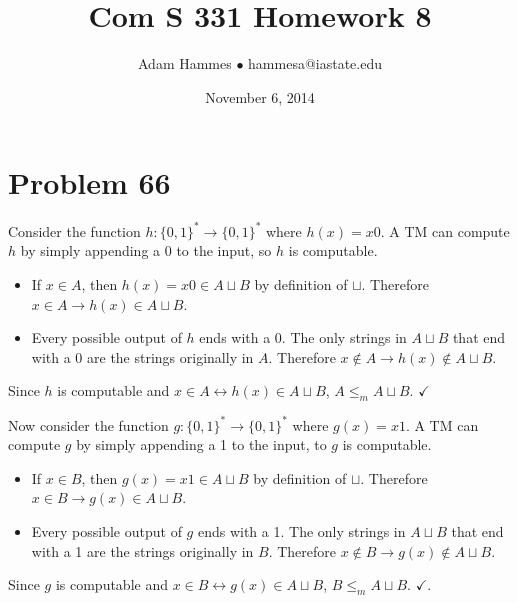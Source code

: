 \documentclass[11pt]{article}
\let\iff\leftrightarrow
\let\imp\rightarrow
\begin{document}
\title{Com S 331 Homework 8}
\author{Adam Hammes $\bullet$ hammesa@iastate.edu}
\date{November 6, 2014}
\maketitle

\section*{Problem 66}

Consider the function $h: \{0,1\}^* \imp \{0,1\}^*$ where $h(x) = x0$.
A TM can compute $h$ by simply appending a 0 to the input, so $h$ is computable.
\begin{itemize}
	\item If $x \in A$, then $h(x) = x0 \in A \sqcup B$ by definition of $\sqcup$. 
	Therefore $x \in A \imp h(x) \in A \sqcup B$.
	\item Every possible output of $h$ ends with a 0.
	The only strings in $A \sqcup B$ that end with a 0 are the strings originally in $A$.
	Therefore $ x \notin A \imp h(x) \notin A \sqcup B$.
\end{itemize}

Since $h$ is computable and $x \in A \iff h(x) \in A \sqcup B$, $A \leq _m A \sqcup B$. $\checkmark$

Now consider the function $g: \{0,1\}^* \imp \{0,1\}^*$ where $g(x) = x1$.
A TM can compute $g$ by simply appending a 1 to the input, to $g$ is computable.
\begin{itemize}
	\item If $x \in B$, then $g(x) = x1 \in A \sqcup B$ by definition of $\sqcup$. 
	Therefore $x \in B \imp g(x) \in A \sqcup B$.
	\item Every possible output of $g$ ends with a 1.
	The only strings in $A \sqcup B$ that end with a 1 are the strings originally in $B$.
	Therefore $ x \notin B \imp g(x) \notin A \sqcup B$.
\end{itemize}

Since $g$ is computable and $x \in B \iff g(x) \in A \sqcup B$, $B \leq _m A \sqcup B$. $\checkmark$.
\end{document}
